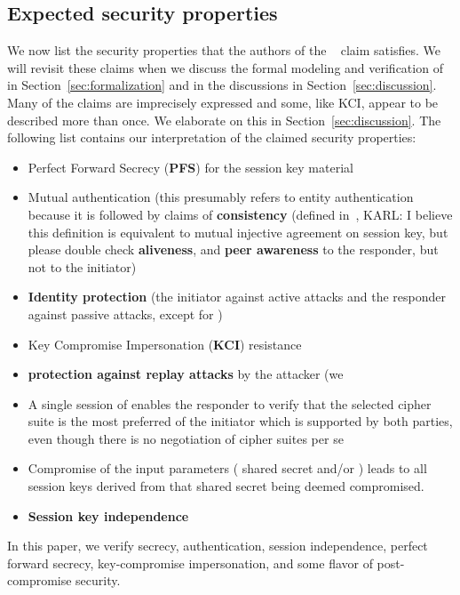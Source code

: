 \subsection{Expected security properties}
\label{sec:claimedProperties}
\fillhack
We now list the security properties that the authors
of the \mSpec{}~\cite{selander-lake-edhoc-01} claim \mEdhoc{} satisfies.
%
We will revisit these claims when we discuss the formal modeling and
verification of \mEdhoc{} in Section~\ref{sec:formalization} and in the
discussions in Section~\ref{sec:discussion}.
%
Many of the claims are imprecisely expressed and some, like KCI, appear to be
described more than once.
%
We elaborate on this in Section~\ref{sec:discussion}.
%
The following list contains our interpretation of the claimed security
properties:
\begin{itemize}
    \item Perfect Forward Secrecy (\textbf{PFS}) for the session key material
    \item Mutual authentication (this presumably refers to entity authentication
        because it is followed by claims of
        \textbf{consistency} (defined in~\cite{sigma}, {\color{red} KARL: I
            believe this definition is equivalent to mutual injective agreement
            on session key, but please double check}
        \textbf{aliveness}, and
        \textbf{peer awareness} to the responder, but not to the initiator)
    \item \textbf{Identity protection} (the initiator against active attacks
        and the responder against passive attacks, except for \mPskPsk{})
    \item Key Compromise Impersonation (\textbf{KCI}) resistance
    \item \textbf{protection against replay attacks} by the attacker (we
    \item A single session of \mEdhoc{} enables the responder to verify
            that the selected cipher suite is the most preferred of the
            initiator which is supported by both parties, even though there is
            no negotiation of cipher suites per se
    \item Compromise of the \mHkdf{} input parameters (\mGxy{} shared
            secret and/or \mPsk) leads to all session keys derived from that
            shared secret being deemed compromised.
        \item \textbf{Session key independence}
\end{itemize}
%
In this paper, we verify {\color{red} secrecy, authentication, session independence,
perfect forward secrecy, key-compromise impersonation, and some
flavor of post-compromise security.}
%
